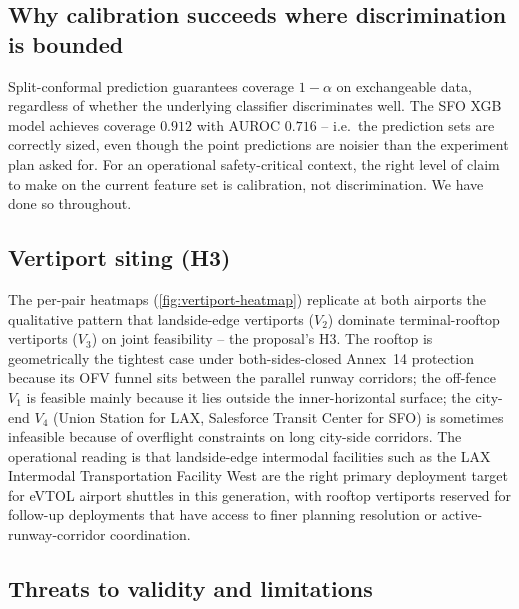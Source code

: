 \subsection{Why calibration succeeds where discrimination is bounded}

Split-conformal prediction \citep{vovk_conformal,angelopoulos2021gentle}
guarantees coverage $1 - \alpha$ on exchangeable data, regardless of
whether the underlying classifier discriminates well. The SFO XGB model
achieves coverage $0.912$ with AUROC $0.716$ -- i.e.\ the
prediction sets are correctly sized, even though the point predictions
are noisier than the experiment plan asked for. For an operational
safety-critical context, the right level of claim to make on the current
feature set is calibration, not discrimination. We have done so throughout.

\subsection{Vertiport siting (H3)}

The per-pair heatmaps (\cref{fig:vertiport-heatmap}) replicate at both
airports the qualitative pattern that landside-edge vertiports ($V_2$)
dominate terminal-rooftop vertiports ($V_3$) on joint feasibility -- the
proposal's H3. The rooftop is geometrically the tightest case under
both-sides-closed Annex~14 protection because its OFV funnel sits between
the parallel runway corridors; the off-fence $V_1$ is feasible mainly
because it lies outside the inner-horizontal surface; the city-end $V_4$
(Union Station for LAX, Salesforce Transit Center for SFO) is sometimes
infeasible because of overflight constraints on long city-side corridors.
The operational reading is that landside-edge intermodal facilities such as
the LAX Intermodal Transportation Facility West are the right primary
deployment target for eVTOL airport shuttles in this generation, with
rooftop vertiports reserved for follow-up deployments that have access to
finer planning resolution or active-runway-corridor coordination.

\subsection{Threats to validity and limitations}
\label{sec:discussion-limitations}

